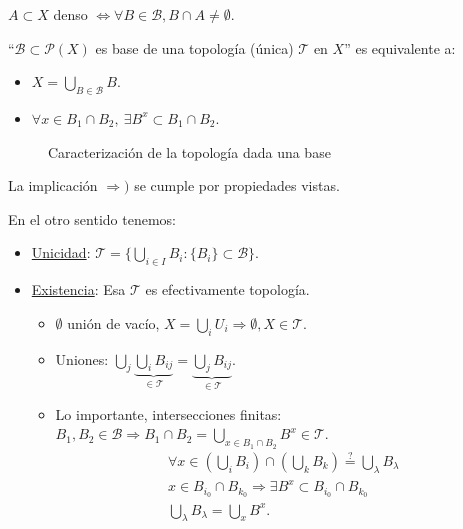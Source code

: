 \begin{il}
$A \subset X$ denso $\Leftrightarrow \forall B \in \mathcal{B}, B \cap A \neq \emptyset$.
\end{il}

\begin{prop}
``$\mathcal{B} \subset \mathcal{P} \left( X \right)$ es base de una topología (única) $\mathcal{T}$ en $X$'' es equivalente a: 
\begin{itemize}
    \item $X = \bigcup_{B \in \mathcal{B}} B$.
    \item $\forall x \in B_1 \cap B_2,\ \exists B^x \subset B_1 \cap B_2$.
\end{itemize}
\begin{figure}[H]
    \centering
    \caption{Caracterización de la topología dada una base}
    \label{fig:caracterización-de-la-topología-dada-una-base}
\end{figure}

\end{prop}
\begin{demo}
La implicación $\Rightarrow)$ se cumple por propiedades vistas.

En el otro sentido tenemos:
\begin{itemize}
    \item \underline{Unicidad}: $\mathcal{T} = \{\bigcup_{i \in  I} B_i: \{B_i\} \subset \mathcal{B}\}$.
    \item \underline{Existencia}: Esa $\mathcal{T}$ es efectivamente topología. 
        \begin{itemize}
            \item $\emptyset$ unión de vacío, $X = \bigcup_{i} U_i \Rightarrow \emptyset, X \in \mathcal{T}$.
            \item Uniones: $\bigcup_{j} \underbrace{\bigcup_{i} B_{ij}}_{\in \mathcal{T}} = \underbrace{\bigcup_{j} B_{ij}}_{\in \mathcal{T}}$. 
            \item Lo importante, intersecciones finitas: $B_1, B_2 \in \mathcal{B} \Rightarrow B_1 \cap B_2 = \bigcup_{x \in B_1 \cap B_2} B^x \in \mathcal{T}$.
            \begin{gather*}
                \forall x \in \left( \bigcup_{i} B_i \right) \cap \left( \bigcup_{k} B_k \right) \stackrel{?}{=} \bigcup_{\lambda} B_{\lambda}\\
                x \in B_{i_0} \cap B_{k_0} \Rightarrow \exists B^x \subset B_{i_0} \cap B_{k_0} \\
                \bigcup_{\lambda} B_{\lambda} = \bigcup_{x} B^x
            .\end{gather*}
        \end{itemize}
\end{itemize}
\end{demo}

